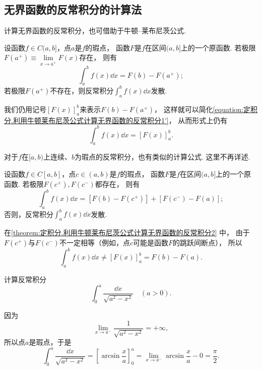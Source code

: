 \subsection{无界函数的反常积分的计算法}
计算无界函数的反常积分，也可借助于牛顿--莱布尼茨公式.
\begin{theorem}\label{theorem:定积分.利用牛顿莱布尼茨公式计算无界函数的反常积分1}
设函数\(f \in C(a,b]\)，点\(a\)是\(f\)的瑕点，
函数\(F\)是\(f\)在区间\((a,b]\)上的一个原函数.
若极限\(F(a^+) \equiv \lim\limits_{x \to a^+} F(x)\)存在，
则有
\begin{equation}\label{equation:定积分.利用牛顿莱布尼茨公式计算无界函数的反常积分1'}
\int_a^b f(x) \dd{x}
= F(b) - F(a^+);
\end{equation}
若极限\(F(a^+)\)不存在，则反常积分\(\int_a^b f(x) \dd{x}\)发散.
\end{theorem}
我们仍用记号\([F(x)]_a^b\)来表示\(F(b) - F(a^+)\)，
这样就可以简化\cref{equation:定积分.利用牛顿莱布尼茨公式计算无界函数的反常积分1'}，
从而形式上仍有
\begin{equation}\label{equation:定积分.利用牛顿莱布尼茨公式计算无界函数的反常积分1}
\int_a^b f(x) \dd{x} = [F(x)]_a^b.
\end{equation}

对于\(f\)在\([a,b)\)上连续、\(b\)为瑕点的反常积分，也有类似的计算公式.
这里不再详述.

\begin{theorem}\label{theorem:定积分.利用牛顿莱布尼茨公式计算无界函数的反常积分2}
设函数\(f \in C[a,b]\)，点\(c\in(a,b)\)是\(f\)的瑕点，
函数\(F\)是\(f\)在区间\((a,b]\)上的一个原函数.
若极限\(F(c^+),F(c^-)\)都存在，
则有
\begin{equation}\label{equation:定积分.利用牛顿莱布尼茨公式计算无界函数的反常积分2}
\int_a^b f(x) \dd{x}
= [F(b) - F(c^+)] + [F(c^-) - F(a)];
\end{equation}
否则，反常积分\(\int_a^b f(x) \dd{x}\)发散.
\end{theorem}
在\cref{theorem:定积分.利用牛顿莱布尼茨公式计算无界函数的反常积分2} 中，
由于\(F(c^+)\)与\(F(c^-)\)不一定相等（例如，点\(c\)可能是函数\(F\)的跳跃间断点），
所以\[
\int_a^b f(x) \dd{x}
\neq [F(x)]_a^b = F(b) - F(a).
\]

\begin{example}
计算反常积分\[
\int_0^a \frac{\dd{x}}{\sqrt{a^2-x^2}}\quad(a>0).
\]
\begin{solution}
因为\[
\lim\limits_{x \to a^-} \frac{1}{\sqrt{a^2-x^2}} = +\infty,
\]所以点\(a\)是瑕点，于是\[
\int_0^a \frac{\dd{x}}{\sqrt{a^2-x^2}}
= \left[ \arcsin\frac{x}{a} \right]_0^a
= \lim\limits_{x \to a^-} \arcsin\frac{x}{a} - 0 = \frac{\pi}{2}.
\]
\end{solution}
\end{example}

